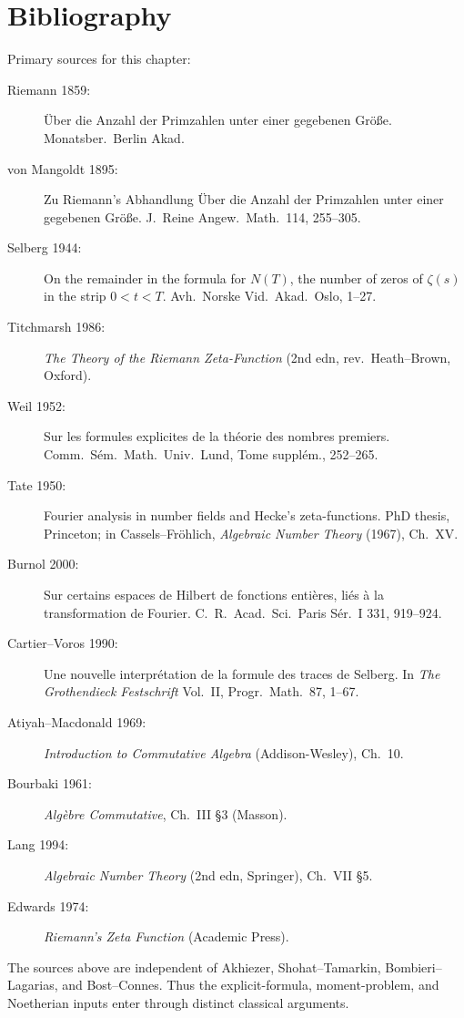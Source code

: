 \section{Bibliography}
\label{v4-arith:w5-i:bibliography}

Primary sources for this chapter:

\begin{description}
\item[Riemann 1859:] \"Uber die Anzahl der Primzahlen unter einer
gegebenen Gr\"o{\ss}e. Monatsber.~Berlin Akad.
\item[von Mangoldt 1895:] Zu Riemann's Abhandlung \"Uber die Anzahl
der Primzahlen unter einer gegebenen Gr\"o{\ss}e.
J.~Reine Angew.~Math.~114, 255--305.
\item[Selberg 1944:] On the remainder in the formula for \(N(T)\),
the number of zeros of \(\zeta(s)\) in the strip \(0<t<T\).
Avh.~Norske Vid.~Akad.~Oslo, 1--27.
\item[Titchmarsh 1986:] \emph{The Theory of the Riemann Zeta-Function}
(2nd edn, rev.~Heath--Brown, Oxford).
\item[Weil 1952:] Sur les formules explicites de la th\'eorie des
nombres premiers. Comm.~S\'em.~Math.~Univ.~Lund, Tome suppl\'em.,
252--265.
\item[Tate 1950:] Fourier analysis in number fields and Hecke's
zeta-functions. PhD thesis, Princeton; in Cassels--Fr\"ohlich,
\emph{Algebraic Number Theory} (1967), Ch.~XV.
\item[Burnol 2000:] Sur certains espaces de Hilbert de fonctions
enti\`eres, li\'es \`a la transformation de Fourier.
C.~R.~Acad.~Sci.~Paris S\'er.~I 331, 919--924.
\item[Cartier--Voros 1990:] Une nouvelle interpr\'etation de la formule
des traces de Selberg. In \emph{The Grothendieck Festschrift} Vol.~II,
Progr.~Math.~87, 1--67.
\item[Atiyah--Macdonald 1969:] \emph{Introduction to Commutative
Algebra} (Addison-Wesley), Ch.~10.
\item[Bourbaki 1961:] \emph{Alg\`ebre Commutative}, Ch.~III \S3
(Masson).
\item[Lang 1994:] \emph{Algebraic Number Theory} (2nd edn, Springer),
Ch.~VII \S5.
\item[Edwards 1974:] \emph{Riemann's Zeta Function} (Academic Press).
\end{description}

The sources above are independent of Akhiezer, Shohat--Tamarkin,
Bombieri--Lagarias, and Bost--Connes. Thus the explicit-formula,
moment-problem, and Noetherian inputs enter through distinct classical
arguments.
